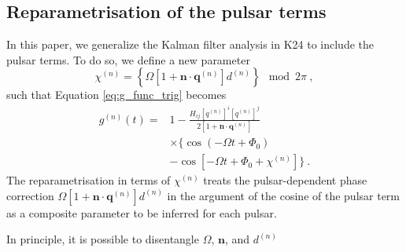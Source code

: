 \documentclass[fleqn,usenatbib,useAMS]{mnras}
\begin{document}
\subsection{Reparametrisation of the pulsar terms} \label{sec:pulsar_term2}
In this paper, we generalize the Kalman filter analysis in K24 to include the pulsar terms. To do so, we define a new parameter 
\begin{equation}
	\chi^{(n)} = \left\{ \Omega \left[ 1 + \boldsymbol{n}\cdot \boldsymbol{q}^{(n)} \right]  d^{(n)} \right \} \mod 2 \pi \ , \label{eq:chi_param}
\end{equation}
such that Equation \eqref{eq:g_func_trig} becomes
\begin{align}
	g^{(n)}(t) =& 1 - \frac{ H_{ij}[q^{(n)}]^i [q^{(n)}]^j }{2 [1 + \boldsymbol{n}\cdot \boldsymbol{q}^{(n)}] } \nonumber \\
	& \times \Big \{\cos\left(-\Omega t +\Phi_0\right) \nonumber \\
	&- \cos \left [-\Omega t +\Phi_0 + \chi^{(n)} \right ] \Big \} \ .
	\label{eq:g_func_trig_chi}
\end{align}
The reparametrisation in terms of $\chi^{(n)}$ treats the pulsar-dependent phase correction $\Omega \left[ 1 + \boldsymbol{n}\cdot \boldsymbol{q}^{(n)} \right]  d^{(n)}$ in the argument of the cosine of the pulsar term as a composite parameter to be inferred for each pulsar. 




In principle, it is possible to disentangle $\Omega$, $\boldsymbol{n}$, and $d^{(n)}$ 
\end{document}
